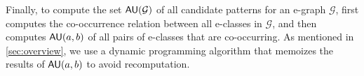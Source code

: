 Finally, to compute the set $\mathsf{AU}(\mathcal{G})$ of all candidate patterns for an e-graph $\mathcal{G}$,
 first computes the co-occurrence relation between all e-classes in $\mathcal{G}$,
and then computes $\mathsf{AU}(a,b)$ of all pairs of e-classes that are co-occurring.
%
As mentioned in \autoref{sec:overview},
we use a dynamic programming algorithm that memoizes the results of $\mathsf{AU}(a,b)$
to avoid recomputation.



